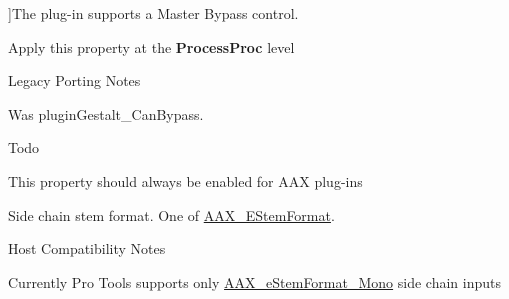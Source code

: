 \begin{Desc}
\begin{description}
{}]The plug-\/in supports a Master Bypass control. \begin{DoxyItemize}
\item Apply this property at the {\bfseries Process\+Proc} level\end{DoxyItemize}
\begin{DoxyRefDesc}{Legacy Porting Notes}
\item[\hyperlink{a00384__porting_notes000046}{Legacy Porting Notes}]Was plugin\+Gestalt\+\_\+\+Can\+Bypass.\end{DoxyRefDesc}


\begin{DoxyRefDesc}{Todo}
\item[\hyperlink{a00382__todo000051}{Todo}]This property should always be enabled for A\+A\+X plug-\/ins \end{DoxyRefDesc}
\item[{\em 
\hypertarget{a00283_a6571f4e41a5dd06e4067249228e2249eae71ad10ce55fb8c4076fe70315b689ae}{}A\+A\+X\+\_\+e\+Property\+\_\+\+Side\+Chain\+Stem\+Format\label{a00283_a6571f4e41a5dd06e4067249228e2249eae71ad10ce55fb8c4076fe70315b689ae}
}]Side chain stem format. One of \hyperlink{a00206_ad8af5ef008b2bd478add9a0acb0a1d85}{A\+A\+X\+\_\+\+E\+Stem\+Format}. \begin{DoxyRefDesc}{Host Compatibility Notes}
\item[\hyperlink{a00380__compatibility_notes000063}{Host Compatibility Notes}]Currently Pro Tools supports only \hyperlink{a00206_ad8af5ef008b2bd478add9a0acb0a1d85a0cc08ddb9923a4093c820efe84588947}{A\+A\+X\+\_\+e\+Stem\+Format\+\_\+\+Mono} side chain inputs\end{DoxyRefDesc}



\end{description}
\end{Desc}
